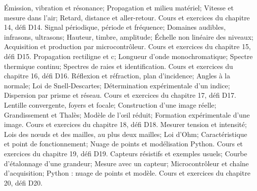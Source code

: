 Émission, vibration et résonance; Propagation et milieu matériel; Vitesse et mesure dans l’air; Retard, distance et aller-retour. Cours et exercices du chapitre 14, défi D14.
Signal périodique, période et fréquence; Domaines audibles, infrasons, ultrasons; Hauteur, timbre, amplitude; Échelle non linéaire des niveaux; Acquisition et production par microcontrôleur. Cours et exercices du chapitre 15, défi D15.
Propagation rectiligne et c; Longueur d’onde monochromatique; Spectre thermique continu; Spectres de raies et identification. Cours et exercices du chapitre 16, défi D16.
Réflexion et réfraction, plan d’incidence; Angles à la normale; Loi de Snell-Descartes; Détermination expérimentale d’un indice; Dispersion par prisme et réseau. Cours et exercices du chapitre 17, défi D17.
Lentille convergente, foyers et focale; Construction d’une image réelle; Grandissement et Thalès; Modèle de l’œil réduit; Formation expérimentale d’une image. Cours et exercices du chapitre 18, défi D18.
Mesurer tension et intensité; Lois des nœuds et des mailles, au plus deux mailles; Loi d’Ohm; Caractéristique et point de fonctionnement; Nuage de points et modélisation Python. Cours et exercices du chapitre 19, défi D19.
Capteurs résistifs et exemples usuels; Courbe d’étalonnage d’une grandeur; Mesure avec un capteur; Microcontrôleur et chaîne d’acquisition; Python : nuage de points et modèle. Cours et exercices du chapitre 20, défi D20.

